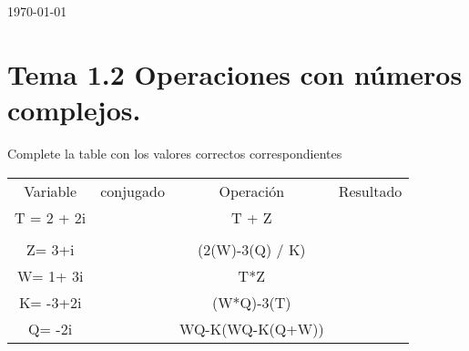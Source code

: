 \documentclass[12pt,a4paper]{report}
\begin{document}
\begin{center}
\vspace{2cm} 																				
\begin{center}	
{\large \today}																	%
 			\end{center}												  						
\end{center}	

\newpage

\section*{Tema 1.2 Operaciones con números complejos.}
\justify 
Complete la table con los valores correctos correspondientes

\begin{tabular}{ | c | c | c | c | }
	\rowcolor{gray}
	Variable & conjugado & Operación & Resultado\\ 
	T = 2 + 2i  &  &T + Z \\
	\rowcolor{white}
	& &\\
 	\rowcolor{gray}
	Z= 3+i& & (2(W)-3(Q) / K)&\\
	\rowcolor{white}
	W= 1+ 3i& &T*Z&\\
	\rowcolor{gray}
	K= -3+2i& & (W*Q)-3(T)&\\
	\rowcolor {white}
	Q= -2i& & WQ-K(WQ-K(Q+W))&\\

	
\end{tabular}
\end{document}
